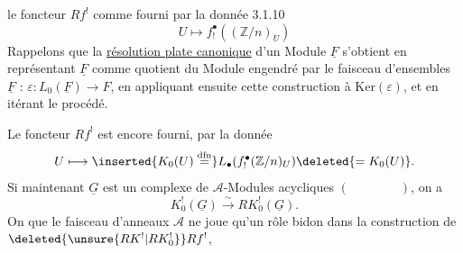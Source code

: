 le foncteur $Rf^!$ comme fourni par la  donnée 3.1.10
\[
 U\longmapsto f_!^\bullet((\mathbb Z/n)_U)
\]
Rappelons que la \uline{résolution plate canonique}  d'un Module $\underline F$ s'obtient en représentant $\underline F$ comme quotient du Module engendré par le faisceau d'ensembles $\underline F$ : $\varepsilon:L_0(\underline F)\longrightarrow F$, en appliquant ensuite cette construction à $\mathrm{Ker}(\varepsilon)$, et en itérant le procédé.

Le foncteur $Rf^!$ est encore fourni,  par la donnée
\[
 U\longmapsto\inserted{K_0(U)\overset{\mathrm{dfn}}{=}}L_\bullet(f_!^\bullet(\mathbb Z/n)_U)\deleted{=K_0(U)}.
\]
Si maintenant $\underline G$ est un complexe de $\mathcal A$-Modules acycliques $(\qquad\qquad)$, on a
\[
 K_0^!(\underline G)\xrightarrow{\sim}RK_0^!(\underline G).
\]
On  que le faisceau d'anneaux $\mathcal A$ ne joue qu'un rôle bidon dans la construction de $\deleted{\unsure{RK^!|RK_0^!}} Rf^!$, 
